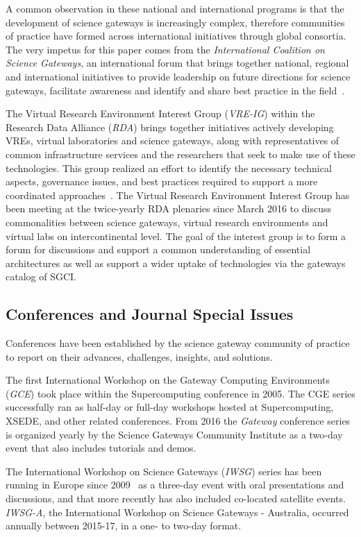 \documentclass[review]{elsarticle}
\begin{document}
A common observation in these national and international programs is that the development of science gateways is increasingly complex, therefore communities of practice have formed across international initiatives through global consortia. The very impetus for this paper comes from the \emph{International Coalition on Science Gateways}, an international forum that brings together national, regional and international initiatives to provide leadership on future directions for science gateways, facilitate awareness and identify and share best practice in the field~\cite{icsg-23}. 

The Virtual Research Environment Interest Group (\emph{VRE-IG}) within the Research Data Alliance (\emph{RDA}) brings together initiatives actively developing VREs, virtual laboratories and science gateways, along with representatives of common infrastructure services and the researchers that seek to make use of these technologies. This group realized an effort to identify the necessary technical aspects, governance issues, and best practices required to support a more coordinated approaches~\cite{rda-vre-ig-24}. 
The Virtual Research Environment Interest Group has been meeting at the twice-yearly RDA plenaries since March 2016 to discuss commonalities between science gateways, virtual research environments and virtual labs on intercontinental level. The goal of the interest group is to form a forum for discussions and support a common understanding of essential architectures as well as support a wider uptake of technologies via the gateways catalog of SGCI.

\subsection{Conferences and Journal Special Issues}

Conferences have been established by the science gateway community of practice to report on their advances, challenges, insights, and solutions.

The first International Workshop on the Gateway Computing Environments (\emph{GCE}) took place within the Supercomputing conference in 2005. The CGE series successfully ran as half-day or full-day workshops hosted at Supercomputing, XSEDE, and other related conferences. 
From 2016 the \emph{Gateway} conference series is organized yearly by the Science Gateways Community Institute as a two-day event that also includes tutorials and demos.

The International Workshop on Science Gateways (\emph{IWSG}) series has been running in Europe since 2009~\cite{iwsg-25} as a three-day event with oral presentations and discussions, and that more recently has also included co-located  satellite events. 
\emph{IWSG-A}, the International Workshop on Science Gateways - Australia, occurred annually between 2015-17, in a one- to two-day format. 
\end{document}
